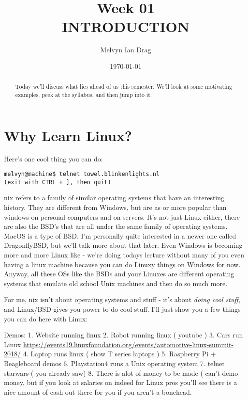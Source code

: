 \documentclass[10pt]{article}
\title{\textbf{Week 01} \\
INTRODUCTION}
\author{
	Melvyn Ian Drag
}
\date{\today}
\begin{document}
\maketitle

\begin{abstract}
Today we'll discuss what lies ahead of us this semester. We'll look at some
motivating examples, peek at the syllabus, and then jump into it.
\end{abstract}

\section{Why Learn Linux?}
Here's one cool thing you can do:

\begin{lstlisting}[style=term]
melvyn@machine$ telnet towel.blinkenlights.nl
(exit with CTRL + ], then quit)
\end{lstlisting}


\*nix refers to a family of similar operating systems that have an interesting
history. They are different from Windows, but are as or more popular than
windows on personal computers and on servers. It's not just Linux either, there
are also the BSD's that are all under the same family of operating systems.
MacOS is a type of BSD. I'm personally quite interested in a newer one called
DragonflyBSD, but we'll talk more about that later. Even Windows is becoming
more and more Linux like - we're doing todays lecture without many of you even
having a linux machine because you can do Linuxy things on Windows for now.
Anyway, all these OSs like the BSDs and your Linuxes are different operating
systems that emulate old school Unix machines and then do so much more.

For me, \*nix isn't about operating systems and stuff - it's about \textit{doing
cool stuff}, and Linux/BSD gives you power to do cool stuff. I'll just show you
a few things you can do here with Linux:

Demos:
1. Website running linux
2. Robot running linux ( youtube )
3. Cars run Linux
\url{https://events19.linuxfoundation.org/events/automotive-linux-summit-2018/}
4. Laptop runs linux ( show T series laptops )
5. Raspberry Pi + Beagleboard demos
6. Playstation4 runs a Unix operating system
7. telnet starwars ( you already saw)
8. There is alot of money to be made ( can't demo money, but if you look at
salaries on indeed for Linux pros you'll see there is a nice amount of cash out
there for you if you aren't a bonehead.
\end{document}
